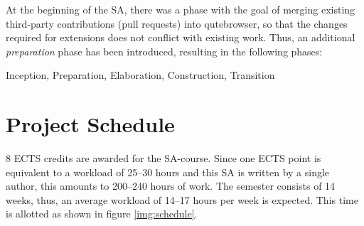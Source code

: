 \documentclass[a4paper,parskip=full]{scrreprt}
\begin{document}
At the beginning of the SA, there was a phase with the goal of merging existing
third-party contributions (pull requests) into qutebrowser, so that the changes
required for extensions does not conflict with existing work. Thus, an additional
\emph{preparation} phase has been introduced, resulting in the following phases:

Inception, Preparation, Elaboration, Construction, Transition

\section{Project Schedule}
\label{schedule}

8 ECTS credits are awarded for the SA-course. Since one ECTS point is equivalent
to a workload of 25--30 hours \autocite{ects} and this SA is written by a single
author, this amounts to 200--240 hours of work. The semester consists of 14
weeks, thus, an average workload of 14--17 hours per week is expected. This time
is allotted as shown in figure \ref{img:schedule}.
\end{document}

